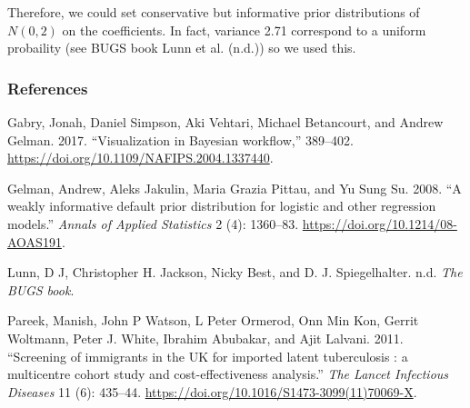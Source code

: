 \documentclass[]{article}
\begin{document}
Therefore, we could set conservative but informative prior distributions
of \(N(0, 2)\) on the coefficients. In fact, variance 2.71 correspond to
a uniform probaility (see BUGS book Lunn et al. (n.d.)) so we used this.

\hypertarget{references}{%
\subsubsection*{References}\label{references}}

\hypertarget{refs}{}
\leavevmode\hypertarget{ref-Gabry2017}{}%
Gabry, Jonah, Daniel Simpson, Aki Vehtari, Michael Betancourt, and
Andrew Gelman. 2017. ``Visualization in Bayesian workflow,'' 389--402.
\url{https://doi.org/10.1109/NAFIPS.2004.1337440}.

\leavevmode\hypertarget{ref-Gelman2008}{}%
Gelman, Andrew, Aleks Jakulin, Maria Grazia Pittau, and Yu Sung Su.
2008. ``A weakly informative default prior distribution for logistic and
other regression models.'' \emph{Annals of Applied Statistics} 2 (4):
1360--83. \url{https://doi.org/10.1214/08-AOAS191}.

\leavevmode\hypertarget{ref-Lunn}{}%
Lunn, D J, Christopher H. Jackson, Nicky Best, and D. J. Spiegelhalter.
n.d. \emph{The BUGS book}.

\leavevmode\hypertarget{ref-Pareek2006}{}%
Pareek, Manish, John P Watson, L Peter Ormerod, Onn Min Kon, Gerrit
Woltmann, Peter J. White, Ibrahim Abubakar, and Ajit Lalvani. 2011.
``Screening of immigrants in the UK for imported latent tuberculosis : a
multicentre cohort study and cost-effectiveness analysis.'' \emph{The
Lancet Infectious Diseases} 11 (6): 435--44.
\url{https://doi.org/10.1016/S1473-3099(11)70069-X}.
\end{document}
